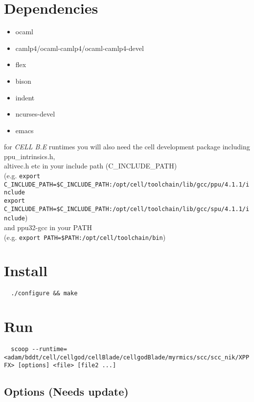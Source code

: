 \documentclass[a4paper]{article}
\begin{document}
\section{Dependencies}

\begin{itemize}
  \setlength{\itemsep}{1pt}
  \setlength{\parskip}{0pt}
  \setlength{\parsep}{0pt}
  \item ocaml
  \item camlp4/ocaml-camlp4/ocaml-camlp4-devel
  \item flex
  \item bison
  \item indent
  \item ncurses-devel
  \item emacs
\end{itemize}

\begin{tabbing}
for \emph{CELL B.E} runtimes you will also need the cell development package
including ppu\_intrinsics.h,\\ altivec.h etc in your include path
(C\_INCLUDE\_PATH)\\
  (e.g. \=\verb!export C_INCLUDE_PATH=$C_INCLUDE_PATH:/opt/cell/toolchain/lib/gcc/ppu/4.1.1/include!\\
   \>\verb!export C_INCLUDE_PATH=$C_INCLUDE_PATH:/opt/cell/toolchain/lib/gcc/spu/4.1.1/include!)\\
  and ppu32-gcc in your PATH\\
  (e.g. \verb!export PATH=$PATH:/opt/cell/toolchain/bin!)\\
\end{tabbing}

\section{Install}

  \verb!  ./configure && make!

\section{Run}

  \verb!  scoop --runtime=<adam/bddt/cell/cellgod/cellBlade/cellgodBlade/myrmics/scc/scc_nik/XPPFX> [options] <file> [file2 ...]!

\subsection{Options (Needs update)}
\end{document}
